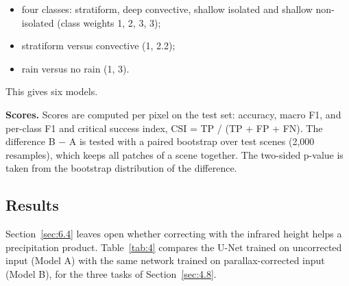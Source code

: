 \begin{itemize}
\tightlist
\item
  four classes: stratiform, deep convective, shallow isolated and shallow non-isolated (class weights 1, 2, 3, 3);
\item
  stratiform versus convective (1, 2.2);
\item
  rain versus no rain (1, 3).
\end{itemize}

This gives six models.

\textbf{Scores.} Scores are computed per pixel on the test set: accuracy, macro F1, and per-class F1 and critical success index, CSI = TP / (TP + FP + FN). The difference B − A is tested with a paired bootstrap over test scenes (2,000 resamples), which keeps all patches of a scene together. The two-sided p-value is taken from the bootstrap distribution of the difference.

\subsection{Results}\label{sec:6.8}

Section~\ref{sec:6.4} leaves open whether correcting with the infrared height helps a precipitation product. Table~\ref{tab:4} compares the U-Net trained on uncorrected input (Model A) with the same network trained on parallax-corrected input (Model B), for the three tasks of Section~\ref{sec:4.8}.


